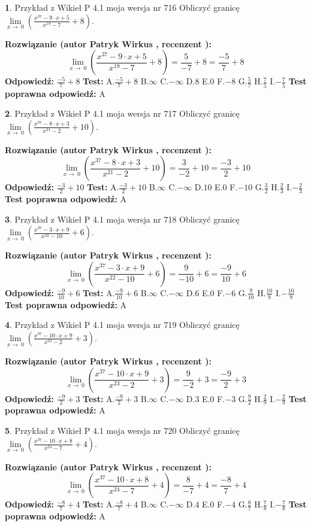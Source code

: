 \documentclass[12pt, a4paper]{article}
\theoremstyle{definition} %
\newtheorem{zad}{}
\newcommand{\zadStart}[1]{\begin{zad}#1\newline}
\newcommand{\zadStop}{\end{zad}}
\newcommand{\rozwStart}[2]{\noindent \textbf{Rozwiązanie (autor #1 , recenzent #2): }\newline}
\newcommand{\rozwStop}{\newline}
\newcommand{\odpStart}{\noindent \textbf{Odpowiedź:}\newline}
\newcommand{\odpStop}{\newline}
\newcommand{\testStart}{\noindent \textbf{Test:}\newline}
\newcommand{\testStop}{\newline}
\newcommand{\kluczStart}{\noindent \textbf{Test poprawna odpowiedź:}\newline}
\newcommand{\kluczStop}{\newline}
\begin{document}
\zadStart{Przykład z Wikieł P 4.1 moja wersja nr 716}
Obliczyć granicę $\lim\limits_{x\to\ 0}(\frac{x^{37}-9 \cdot x +5}{x^{19}-7}+8)$.
\zadStop
\rozwStart{Patryk Wirkus}{}
$$\lim\limits_{x\to\ 0}(\frac{x^{37}-9 \cdot x +5}{x^{19}-7}+8)=\frac{5}{-7}+8=\frac{-5}{7}+8$$
\rozwStop
\odpStart
$\frac{-5}{7}+8$
\odpStop
\testStart
A.$\frac{-5}{7}+8$
B.$\infty$
C.$-\infty$
D.$8$
E.$0$
F.$-8$
G.$\frac{5}{7}$
H.$\frac{7}{5}$
I.$-\frac{7}{5}$
\testStop
\kluczStart
A
\kluczStop



\zadStart{Przykład z Wikieł P 4.1 moja wersja nr 717}
Obliczyć granicę $\lim\limits_{x\to\ 0}(\frac{x^{37}-8 \cdot x +3}{x^{21}-2}+10)$.
\zadStop
\rozwStart{Patryk Wirkus}{}
$$\lim\limits_{x\to\ 0}(\frac{x^{37}-8 \cdot x +3}{x^{21}-2}+10)=\frac{3}{-2}+10=\frac{-3}{2}+10$$
\rozwStop
\odpStart
$\frac{-3}{2}+10$
\odpStop
\testStart
A.$\frac{-3}{2}+10$
B.$\infty$
C.$-\infty$
D.$10$
E.$0$
F.$-10$
G.$\frac{3}{2}$
H.$\frac{2}{3}$
I.$-\frac{2}{3}$
\testStop
\kluczStart
A
\kluczStop



\zadStart{Przykład z Wikieł P 4.1 moja wersja nr 718}
Obliczyć granicę $\lim\limits_{x\to\ 0}(\frac{x^{37}-3 \cdot x +9}{x^{22}-10}+6)$.
\zadStop
\rozwStart{Patryk Wirkus}{}
$$\lim\limits_{x\to\ 0}(\frac{x^{37}-3 \cdot x +9}{x^{22}-10}+6)=\frac{9}{-10}+6=\frac{-9}{10}+6$$
\rozwStop
\odpStart
$\frac{-9}{10}+6$
\odpStop
\testStart
A.$\frac{-9}{10}+6$
B.$\infty$
C.$-\infty$
D.$6$
E.$0$
F.$-6$
G.$\frac{9}{10}$
H.$\frac{10}{9}$
I.$-\frac{10}{9}$
\testStop
\kluczStart
A
\kluczStop



\zadStart{Przykład z Wikieł P 4.1 moja wersja nr 719}
Obliczyć granicę $\lim\limits_{x\to\ 0}(\frac{x^{37}-10 \cdot x +9}{x^{23}-2}+3)$.
\zadStop
\rozwStart{Patryk Wirkus}{}
$$\lim\limits_{x\to\ 0}(\frac{x^{37}-10 \cdot x +9}{x^{23}-2}+3)=\frac{9}{-2}+3=\frac{-9}{2}+3$$
\rozwStop
\odpStart
$\frac{-9}{2}+3$
\odpStop
\testStart
A.$\frac{-9}{2}+3$
B.$\infty$
C.$-\infty$
D.$3$
E.$0$
F.$-3$
G.$\frac{9}{2}$
H.$\frac{2}{9}$
I.$-\frac{2}{9}$
\testStop
\kluczStart
A
\kluczStop



\zadStart{Przykład z Wikieł P 4.1 moja wersja nr 720}
Obliczyć granicę $\lim\limits_{x\to\ 0}(\frac{x^{37}-10 \cdot x +8}{x^{24}-7}+4)$.
\zadStop
\rozwStart{Patryk Wirkus}{}
$$\lim\limits_{x\to\ 0}(\frac{x^{37}-10 \cdot x +8}{x^{24}-7}+4)=\frac{8}{-7}+4=\frac{-8}{7}+4$$
\rozwStop
\odpStart
$\frac{-8}{7}+4$
\odpStop
\testStart
A.$\frac{-8}{7}+4$
B.$\infty$
C.$-\infty$
D.$4$
E.$0$
F.$-4$
G.$\frac{8}{7}$
H.$\frac{7}{8}$
I.$-\frac{7}{8}$
\testStop
\kluczStart
A
\kluczStop
\end{document}
